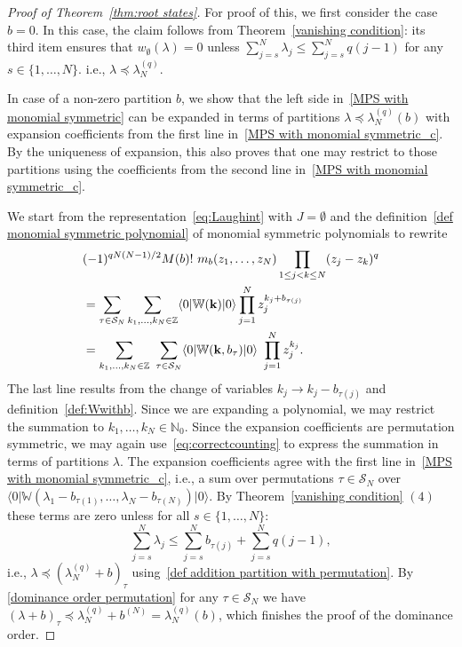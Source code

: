 \documentclass[letterpaper, DIV=17]{scrartcl}
\numberwithin{equation}{section}
\theoremstyle{definition}
\begin{document}
\begin{proof}[Proof of Theorem~\ref{thm:root states}]
For proof of this, we first consider the case $ b = 0 $. In this case, the claim follows from Theorem~\ref{vanishing condition}: its third item ensures that $ w_\emptyset(\lambda) = 0 $ unless $ \sum_{j=s}^N \lambda_j \leq \sum_{j=s}^N q(j-1) $  for any $ s \in \{1, \dots , N\} $. i.e.,  $\lambda \preceq  \lambda^{(q)}_{N} $. 

In case of a non-zero partition $ b $, we show that the left side in~\eqref{MPS with monomial symmetric} can be expanded in terms of partitions $  \lambda  \preceq  \lambda^{(q)}_{N}(b) $ with expansion coefficients from the first line in~\eqref{MPS with monomial symmetric_c}. By the uniqueness of expansion, this also proves that one may restrict to those partitions using the coefficients from the second line in~\eqref{MPS with monomial symmetric_c}. 

We start from the representation~\eqref{eq:Laughint} with $ J = \emptyset $ and the definition~\eqref{def monomial symmetric polynomial} of monomial symmetric polynomials to rewrite
\begin{align*}
& (-1)^{qN(N-1)/2}  M(b)! \ m_{b}(z_1, \dots, z_N)  \prod_{1\leq j<k\leq N} (z_j-z_k)^q \notag \\
& = \sum_{\tau \in \mathcal{S}_N}   \sum_{k_1, \dots, k_N\in \mathbb{Z}}   \langle 0 \vert \mathbb{W}(\mathbf{k}) \vert 0 \rangle  \prod_{j=1}^N z_j^{k_j+b_{\tau(j)}}  \notag \\
& =   \sum_{k_1, \dots, k_N\in \mathbb{Z}}\ \sum_{\tau \in \mathcal{S}_N}  \langle 0 \vert \mathbb{W}(\mathbf{k},b_{\tau}) \vert 0 \rangle \   \prod_{j=1}^N z_j^{k_j} .
\end{align*}
The last line results from the change of variables $ k_j \to k_j - b_{\tau(j)} $ and definition~\eqref{def:Wwithb}. Since we are expanding a polynomial, we may restrict the summation to $ k_1, \dots, k_N \in \mathbb{N}_0 $. Since the expansion coefficients are permutation symmetric,
we may again use~\eqref{eq:correctcounting} to express the summation in terms of partitions $ \lambda $. The expansion coefficients agree with the first line in~\eqref{MPS with monomial symmetric_c}, i.e., a sum over permutations $ \tau \in \mathcal{S}_N $ over $   \langle 0 \vert \mathbb{W}(\lambda_1 -b_{\tau(1)}, \dots , \lambda_N -b_{\tau(N)} ) \vert 0 \rangle $.  By Theorem~\ref{vanishing condition}  $(4)$ these terms are zero unless
for all $ s \in \{1,\dots, N\} $:
$$
\sum_{j=s}^N \lambda_j \leq \sum_{j=s}^N b_{\tau(j)} +  \sum_{j=s}^N q (j-1) ,
$$
i.e., $ \lambda  \preceq  (\lambda^{(q)}_{N} + b)_\tau $ using~\eqref{def addition partition with permutation}.  By \eqref{dominance order permutation}  for any $ \tau \in \mathcal{S}_N $ we have $(\lambda+b)_{\tau} \preceq  \lambda^{(q)}_N +b^{(N)}=  \lambda^{(q)}_N(b)$, which finishes the proof of the dominance order. 



\end{proof}
\end{document}
